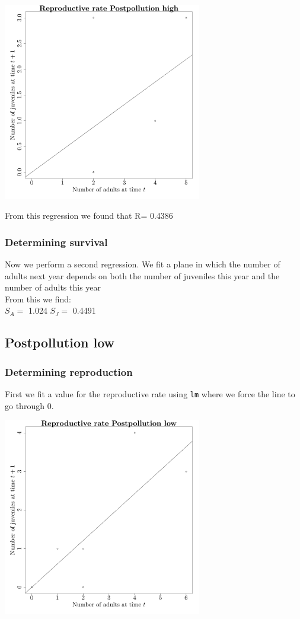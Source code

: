 \documentclass{article}\usepackage[]{graphicx}\usepackage[]{color}
\begin{document}
{\centering \includegraphics[width=0.65\textwidth]{figure/k57} 

}



 From this regression we found that R= 0.4386 

\subsubsection{Determining survival}

Now we perform a second regression. We fit a plane in which the number of adults next year depends on both the number of juveniles this year and the number of adults this year\\From this we find:\\ 
$S_A=$ 1.024 
$S_J=$ 0.4491 
\subsection{ Postpollution low }
\subsubsection{Determining reproduction}

First we fit a value for the reproductive rate using \texttt{lm} where we force the line to go through $0$. 



{\centering \includegraphics[width=0.65\textwidth]{figure/k58} 

}
\end{document}

